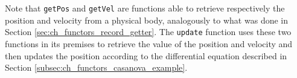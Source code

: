 \noindent
Note that \texttt{getPos} and \texttt{getVel} are functions able to retrieve respectively the position and velocity from a physical body, analogously to what was done in Section \ref{sec:ch_functors_record_getter}. The \texttt{update} function uses these two functions in its premises to retrieve the value of the position and velocity and then updates the position according to the differential equation described in Section \ref{subsec:ch_functors_casanova_example}.
